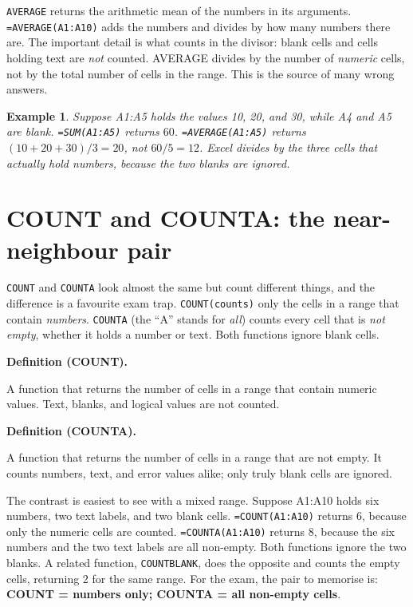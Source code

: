 \documentclass[11pt]{article}
\newtheorem{example}{Example}[section]
\newenvironment{definitionbox}[1]{%
  \par\noindent\textbf{Definition (#1).}\ \itshape
}{\par\vspace{0.3em}}
\begin{document}
\texttt{AVERAGE} returns the arithmetic mean of the numbers in its arguments.
\texttt{=AVERAGE(A1:A10)} adds the numbers and divides by how many numbers
there are. The important detail is what counts in the divisor: blank cells and
cells holding text are \emph{not} counted. AVERAGE divides by the number of
\emph{numeric} cells, not by the total number of cells in the range. This is
the source of many wrong answers.

\begin{example}
Suppose A1:A5 holds the values 10, 20, and 30, while A4 and A5 are blank.
\texttt{=SUM(A1:A5)} returns $60$. \texttt{=AVERAGE(A1:A5)} returns
$(10+20+30)/3 = 20$, not $60/5 = 12$. Excel divides by the three cells that
actually hold numbers, because the two blanks are ignored.
\end{example}

\section{COUNT and COUNTA: the near-neighbour pair}
\texttt{COUNT} and \texttt{COUNTA} look almost the same but count different
things, and the difference is a favourite exam trap. \texttt{COUNT(counts)}
only the cells in a range that contain \emph{numbers}. \texttt{COUNTA} (the
``A'' stands for \emph{all}) counts every cell that is \emph{not empty},
whether it holds a number or text. Both functions ignore blank cells.

\begin{definitionbox}{COUNT}
A function that returns the number of cells in a range that contain numeric
values. Text, blanks, and logical values are not counted.
\end{definitionbox}

\begin{definitionbox}{COUNTA}
A function that returns the number of cells in a range that are not empty. It
counts numbers, text, and error values alike; only truly blank cells are
ignored.
\end{definitionbox}

The contrast is easiest to see with a mixed range. Suppose A1:A10 holds six
numbers, two text labels, and two blank cells. \texttt{=COUNT(A1:A10)}
returns 6, because only the numeric cells are counted. \texttt{=COUNTA(A1:A10)}
returns 8, because the six numbers and the two text labels are all non-empty.
Both functions ignore the two blanks. A related function, \texttt{COUNTBLANK},
does the opposite and counts the empty cells, returning 2 for the same range.
For the exam, the pair to memorise is: \textbf{COUNT = numbers only; COUNTA =
all non-empty cells}.
\end{document}
